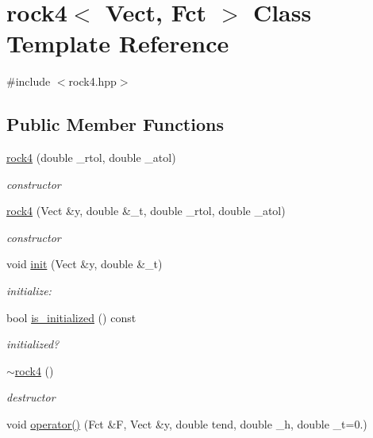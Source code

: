 \hypertarget{classrock4}{\section{rock4$<$ Vect, Fct $>$ Class Template Reference}
\label{classrock4}
}


{\ttfamily \#include $<$rock4.\-hpp$>$}

\subsection*{Public Member Functions}
\begin{DoxyCompactItemize}
\item 
\hyperlink{classrock4_af0b889cf7daf47ea9b1cc548be9a4c78}{rock4} (double \-\_\-rtol, double \-\_\-atol)
\begin{DoxyCompactList}\small\item\em constructor \end{DoxyCompactList}\item 
\hyperlink{classrock4_adfd53403fccc9a8c4d8b3fffd61fd344}{rock4} (Vect \&y, double \&\-\_\-t, double \-\_\-rtol, double \-\_\-atol)
\begin{DoxyCompactList}\small\item\em constructor \end{DoxyCompactList}\item 
void \hyperlink{classrock4_ad5bf1a80857c0c838e9d64aeb63a7874}{init} (Vect \&y, double \&\-\_\-t)
\begin{DoxyCompactList}\small\item\em initialize\-: \end{DoxyCompactList}\item 
bool \hyperlink{classrock4_a9a20b02e616172a1f0d66defafaa307c}{is\-\_\-initialized} () const 
\begin{DoxyCompactList}\small\item\em initialized? \end{DoxyCompactList}\item 
\hyperlink{classrock4_a9cff4164573d62e01253f048d438e06c}{$\sim$rock4} ()
\begin{DoxyCompactList}\small\item\em destructor \end{DoxyCompactList}\item 
void \hyperlink{classrock4_a349ce369e33642b556588d129160f5ce}{operator()} (Fct \&F, Vect \&y, double tend, double \-\_\-h, double \-\_\-t=0.)
\item 

\end{DoxyCompactItemize}
